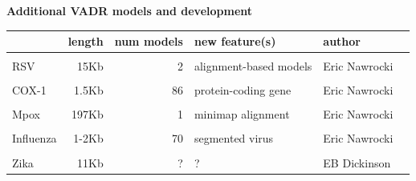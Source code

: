 \documentclass[landscape]{slides}
\begin{document}
\begin{slide}
\begin{center}
  \textbf{Additional VADR models and development}

\small
\begin{tabular}{l|r|r|l|l|l}
 & length & num models & new feature(s) & author\\ \hline
 & & & & & \\ 
RSV & 15Kb & 2 & alignment-based models & Eric Nawrocki \\
 & & & & & \\ 
COX-1 & 1.5Kb & 86 & protein-coding gene & Eric Nawrocki \\
 & & & & & \\ 
Mpox & 197Kb & 1 & minimap alignment & Eric Nawrocki \\
 & & & & & \\ 
Influenza & 1-2Kb & 70 & segmented virus & Eric Nawrocki \\
 & & & & & \\ 
Zika      & 11Kb & ? & ? & EB Dickinson \\
\end{tabular}


\end{center}
  \vfill
\end{slide}
\end{document}
